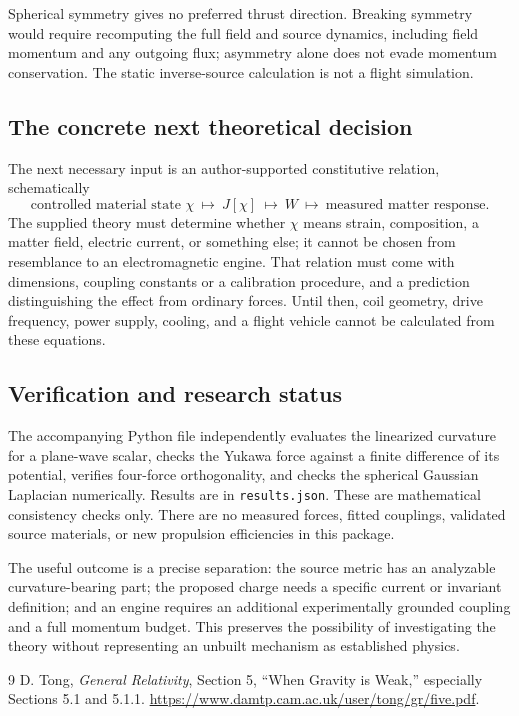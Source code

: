 \documentclass[11pt]{article}
\begin{document}
Spherical symmetry gives no preferred thrust direction. Breaking symmetry would require recomputing the full field and source dynamics, including field momentum and any outgoing flux; asymmetry alone does not evade momentum conservation. The static inverse-source calculation is not a flight simulation.

\subsection{The concrete next theoretical decision}
The next necessary input is an author-supported constitutive relation, schematically
\begin{equation}
 \text{controlled material state }\chi\ \longmapsto\ J[\chi]
 \ \longmapsto\ W\ \longmapsto\ \text{measured matter response}.
\end{equation}
The supplied theory must determine whether $\chi$ means strain, composition, a matter field, electric current, or something else; it cannot be chosen from resemblance to an electromagnetic engine. That relation must come with dimensions, coupling constants or a calibration procedure, and a prediction distinguishing the effect from ordinary forces. Until then, coil geometry, drive frequency, power supply, cooling, and a flight vehicle cannot be calculated from these equations.

\subsection{Verification and research status}
The accompanying Python file independently evaluates the linearized curvature for a plane-wave scalar, checks the Yukawa force against a finite difference of its potential, verifies four-force orthogonality, and checks the spherical Gaussian Laplacian numerically. Results are in \texttt{results.json}. These are mathematical consistency checks only. There are no measured forces, fitted couplings, validated source materials, or new propulsion efficiencies in this package.

The useful outcome is a precise separation: the source metric has an analyzable curvature-bearing part; the proposed charge needs a specific current or invariant definition; and an engine requires an additional experimentally grounded coupling and a full momentum budget. This preserves the possibility of investigating the theory without representing an unbuilt mechanism as established physics.
\begin{thebibliography}{9}
 D. Tong, \emph{General Relativity}, Section 5, ``When Gravity is Weak,'' especially Sections 5.1 and 5.1.1. \url{https://www.damtp.cam.ac.uk/user/tong/gr/five.pdf}.
\end{thebibliography}
\end{document}
